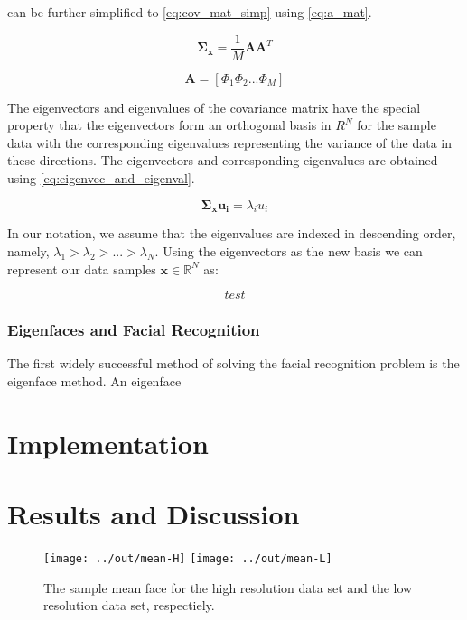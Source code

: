 \documentclass[headings=optiontoheadandtoc,listof=totoc,parskip=full]{scrartcl}
\def \reals {\mathbb{R}}
\begin{document}
 can be further simplified to \cref{eq:cov_mat_simp} using \cref{eq:a_mat}.

\begin{equation}\label{eq:cov_mat_simp}
    \mathbf{\Sigma_x} = \frac{1}{M}\mathbf{A}\mathbf{A}^T
\end{equation}

\begin{equation}\label{eq:a_mat}
    \mathbf{A} = [\Phi_1 \Phi_2 ... \Phi_M]    
\end{equation}

The eigenvectors and eigenvalues of the covariance matrix have the special property that the eigenvectors form an orthogonal basis in $R^N$ for the sample data with the corresponding eigenvalues representing the variance of the data in these directions. The eigenvectors and corresponding eigenvalues are obtained using \cref{eq:eigenvec_and_eigenval}.

\begin{equation}\label{eq:eigenvec_and_eigenval}
    \mathbf{\Sigma_x}\mathbf{u_i} = \lambda_iu_i
\end{equation}

In our notation, we assume that the eigenvalues are indexed in descending order, namely, $\lambda_1 > \lambda_2 > ... > \lambda_N$. Using the eigenvectors as the new basis we can represent our data samples $\mathbf{x} \in \reals^N$ as:

\begin{equation}
    test
\end{equation}

\subsubsection{Eigenfaces and Facial Recognition}

The first widely successful method of solving the facial recognition problem is the eigenface method. An eigenface


\section{Implementation}
\section{Results and Discussion}

\begin{figure}[H]
	\centering
	\texttt{[image: ../out/mean-H]} \quad
	\texttt{[image: ../out/mean-L]}
	\caption{The sample mean face for the high resolution data set and the low resolution data set, respectiely.}
\end{figure}
\end{document}
